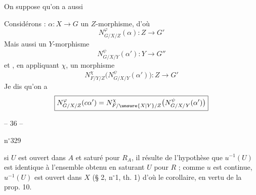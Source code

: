 On suppose qu'on a aussi

Considérons : $\alpha:X\to G$ un $Z$-morphisme, d'où
\[
N^\varphi_{G/X/Z}(\alpha):Z\longrightarrow G'
\]
Mais aussi un $Y$-morphisme
\[
N^\psi_{G/X/Y}(\alpha'):Y\longrightarrow G''
\]
et , en appliquant $\chi$, un morphisme
\[
N^\chi_{F/Y/Z}\bigl(N^\psi_{G/X/Y}(\alpha')\bigr):Z\longrightarrow G'
\]
Je dis qu'on a
\[
\boxed{N^\varphi_{G/X/Z}(c\alpha')=N^\chi_{F/\unsure{X|Y}/Z}\bigl(N^\psi_{G/X/Y}(\alpha')\bigr)}
\]
\begin{center}-- 36 --\end{center}
\hfill n$^{\circ}$329

si $U$ est ouvert dans $A$ et saturé pour $R_A$, il résulte de l'hypothèse que $u^{-1}(U)$ est identique à l'ensemble obtenu en saturant $U$ pour $R$ ; comme $u$ est continue, $u^{-1}(U)$ est ouvert dans $X$ (§ 2, n$^{\circ}$1, th. 1) d'où le corollaire, en vertu de la prop. 10.

